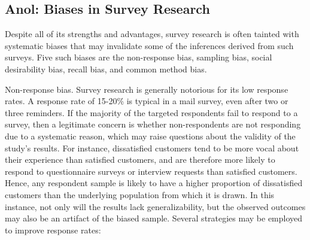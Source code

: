 \subsection{Anol: Biases in Survey Research}

Despite all of its strengths and advantages, survey research is often tainted with systematic biases that may invalidate some of the inferences derived from such surveys. Five such biases are the non-response bias, sampling bias, social desirability bias, recall bias, and common method bias.

Non-response bias. Survey research is generally notorious for its low response rates. A response rate of 15-20\% is typical in a mail survey, even after two or three reminders. If the majority of the targeted respondents fail to respond to a survey, then a legitimate concern is whether non-respondents are not responding due to a systematic reason, which may raise questions about the validity of the study’s results. For instance, dissatisfied customers tend to be more vocal about their experience than satisfied customers, and are therefore more likely to respond to questionnaire surveys or interview requests than satisfied customers. Hence, any respondent sample is likely to have a higher proportion of dissatisfied customers than the underlying population from which it is drawn. In this instance, not only will the results lack generalizability, but the observed outcomes may also be an artifact of the biased sample. Several strategies may be employed to improve response rates:


